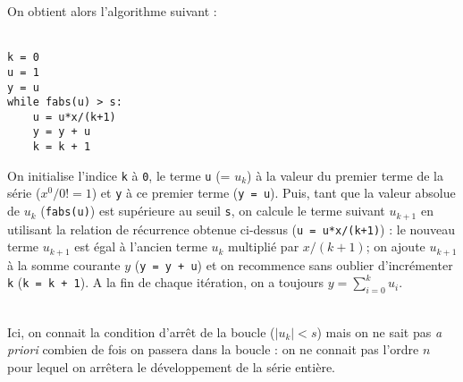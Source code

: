 On obtient alors l'algorithme suivant :\\
\mbox{}\ \ \begin{py}{3cm}
\begin{verbatim}
k = 0
u = 1
y = u
while fabs(u) > s:
    u = u*x/(k+1)
    y = y + u
    k = k + 1
\end{verbatim}
\end{py}
\hfill
\begin{minipage}[t]{12cm}\footnotesize
On initialise l'indice {\tt k} à {\tt 0}, le terme {\tt u} (= $u_k$) à la valeur du premier
terme de la série ($x^0/0! = 1$) et {\tt y} à ce premier terme ({\tt y = u}). Puis, tant que la valeur absolue
de $u_k$ ({\tt fabs(u)}) est supérieure au seuil {\tt s}, on calcule le terme suivant $u_{k+1}$ en
utilisant la relation de récurrence obtenue ci-dessus ({\tt u = u*x/(k+1)}) : le nouveau terme $u_{k+1}$
est égal à l'ancien terme $u_k$ multiplié par $x/(k+1)$; on ajoute $u_{k+1}$ à la somme courante $y$
({\tt y = y + u}) et on recommence sans oublier d'incrémenter {\tt k} ({\tt k = k + 1}). 
A la fin de chaque itération, on a toujours $\displaystyle y = \sum_{i=0}^{k} u_i$.
\end{minipage}\\
Ici, on connait la condition d'arrêt de la boucle ($|u_k| < s$) mais on ne sait pas {\em a priori} 
combien de fois on passera dans la boucle : on ne connait pas l'ordre $n$ pour lequel on arrêtera le
développement de la série entière.


